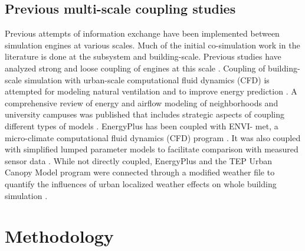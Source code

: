 \documentclass{tBPS2e}
\theoremstyle{plain}
\theoremstyle{definition}
\theoremstyle{remark}
\newcommand{\noteDT}[1]{\footnote{\textcolor{green}{#1}}}
\begin{document}
\subsection{Previous multi-scale coupling studies}
Previous attempts of information exchange have been implemented between
simulation engines at various scales. Much of the initial co-simulation work
in the literature is done at the subsystem and building-scale. Previous studies
have analyzed strong and loose coupling of engines at this scale
\citep{wetter_co-simulation_2011,trcka_co-simulation_2010}. Coupling of building-scale simulation with
urban-scale computational fluid dynamics (CFD) is attempted for modeling
natural ventilation \citep{zhang_coupled_2013} and to improve energy prediction
\citep{bouyer_microclimatic_2011}. A comprehensive review of energy and airflow modeling
of neighborhoods and university campuses was published that includes
strategic aspects of coupling different %
types of models \citep{srebric_building_2015}. EnergyPlus has been coupled with ENVI-
met, a micro-climate computational fluid dynamics (CFD) program
\citep{yang_integrated_2012}. It was also coupled with simplified lumped parameter
models to facilitate comparison with measured sensor data
\citep{martin_estimation_2015}. While not directly coupled, EnergyPlus and the TEP Urban Canopy Model program were connected
through a modified weather file to quantify the influences of urban localized weather effects
on whole building simulation \citep{bueno_combining_2011}.

\section{Methodology}
\label{Methodology}
\end{document}

